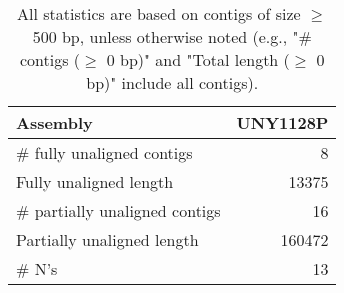 \documentclass[12pt,a4paper]{article}
\begin{document}
\begin{table}[ht]
\begin{center}
\caption{All statistics are based on contigs of size $\geq$ 500 bp, unless otherwise noted (e.g., "\# contigs ($\geq$ 0 bp)" and "Total length ($\geq$ 0 bp)" include all contigs).}
\begin{tabular}{|l*{1}{|r}|}
\hline
Assembly & UNY1128P \\ \hline
\# fully unaligned contigs & 8 \\ \hline
Fully unaligned length & 13375 \\ \hline
\# partially unaligned contigs & 16 \\ \hline
Partially unaligned length & 160472 \\ \hline
\# N's & 13 \\ \hline
\end{tabular}
\end{center}
\end{table}
\end{document}

